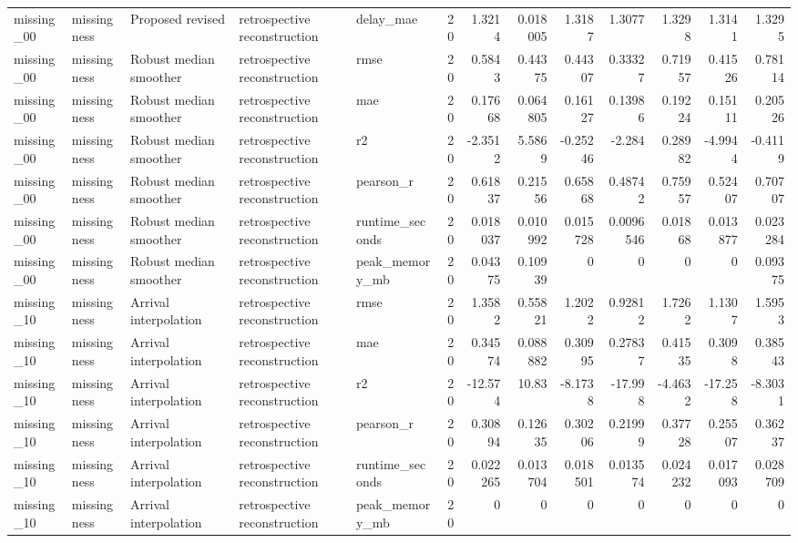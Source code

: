\begin{table}[!htbp]
{{\begin{tabular}{lllllrrrrrrrr}
missing_00 & missingness & Proposed revised & retrospective reconstruction & delay_mae & 20 & 1.3214 & 0.018005 & 1.3187 & 1.3077 & 1.3298 & 1.3141 & 1.3295 \\
missing_00 & missingness & Robust median smoother & retrospective reconstruction & rmse & 20 & 0.5843 & 0.44375 & 0.44307 & 0.33327 & 0.71957 & 0.41526 & 0.78114 \\
missing_00 & missingness & Robust median smoother & retrospective reconstruction & mae & 20 & 0.17668 & 0.064805 & 0.16127 & 0.13986 & 0.19224 & 0.15111 & 0.20526 \\
missing_00 & missingness & Robust median smoother & retrospective reconstruction & r2 & 20 & -2.3512 & 5.5869 & -0.25246 & -2.284 & 0.28982 & -4.9944 & -0.4119 \\
missing_00 & missingness & Robust median smoother & retrospective reconstruction & pearson_r & 20 & 0.61837 & 0.21556 & 0.65868 & 0.48742 & 0.75957 & 0.52407 & 0.70707 \\
missing_00 & missingness & Robust median smoother & retrospective reconstruction & runtime_seconds & 20 & 0.018037 & 0.010992 & 0.015728 & 0.0096546 & 0.01868 & 0.013877 & 0.023284 \\
missing_00 & missingness & Robust median smoother & retrospective reconstruction & peak_memory_mb & 20 & 0.04375 & 0.10939 & 0 & 0 & 0 & 0 & 0.09375 \\
missing_10 & missingness & Arrival interpolation & retrospective reconstruction & rmse & 20 & 1.3582 & 0.55821 & 1.2022 & 0.92812 & 1.7262 & 1.1307 & 1.5953 \\
missing_10 & missingness & Arrival interpolation & retrospective reconstruction & mae & 20 & 0.34574 & 0.088882 & 0.30995 & 0.27837 & 0.41535 & 0.3098 & 0.38543 \\
missing_10 & missingness & Arrival interpolation & retrospective reconstruction & r2 & 20 & -12.574 & 10.83 & -8.1738 & -17.998 & -4.4632 & -17.258 & -8.3031 \\
missing_10 & missingness & Arrival interpolation & retrospective reconstruction & pearson_r & 20 & 0.30894 & 0.12635 & 0.30206 & 0.21999 & 0.37728 & 0.25507 & 0.36237 \\
missing_10 & missingness & Arrival interpolation & retrospective reconstruction & runtime_seconds & 20 & 0.022265 & 0.013704 & 0.018501 & 0.013574 & 0.024232 & 0.017093 & 0.028709 \\
missing_10 & missingness & Arrival interpolation & retrospective reconstruction & peak_memory_mb & 20 & 0 & 0 & 0 & 0 & 0 & 0 & 0 \\

\end{tabular}}}
\end{table}

